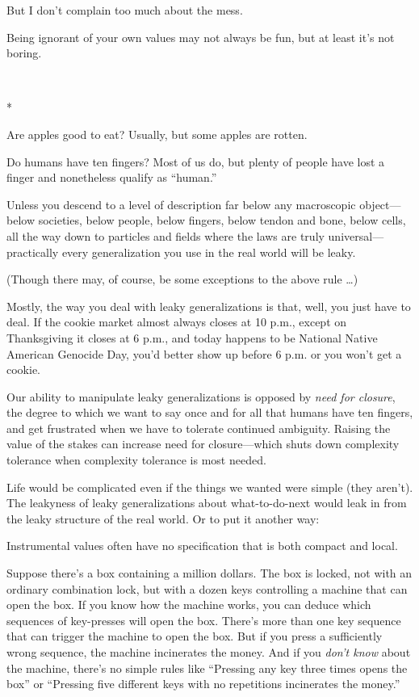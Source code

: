 {
 But I don't complain too much about the mess.}

{
 Being ignorant of your own values may not always be fun, but at
least it's not boring.}

{\centering
 \ ~
\par}

{\centering
 *
\par}


{
 Are apples good to eat? Usually, but some apples are rotten. }

{
 Do humans have ten fingers? Most of us do, but plenty of people
have lost a finger and nonetheless qualify as
``human.''}

{
 Unless you descend to a level of description far below any
macroscopic object---below societies, below people, below fingers,
below tendon and bone, below cells, all the way down to particles and
fields where the laws are truly universal---practically every
generalization you use in the real world will be leaky.}

{
 (Though there may, of course, be some exceptions to the above rule
\ldots)}

{
 Mostly, the way you deal with leaky generalizations is that, well,
you just have to deal. If the cookie market almost always closes at 10
p.m., except on Thanksgiving it closes at 6 p.m., and today happens to
be National Native American Genocide Day, you'd better
show up before 6 p.m. or you won't get a cookie.}

{
 Our ability to manipulate leaky generalizations is opposed by
\textit{need for closure}, the degree to which we want to say once and
for all that humans have ten fingers, and get frustrated when we have
to tolerate continued ambiguity. Raising the value of the stakes can
increase need for closure---which shuts down complexity tolerance when
complexity tolerance is most needed.}

{
 Life would be complicated even if the things we wanted were simple
(they aren't). The leakyness of leaky generalizations
about what-to-do-next would leak in from the leaky structure of the
real world. Or to put it another way:}

{
 Instrumental values often have no specification that is both
compact and local.}

{
 Suppose there's a box containing a million
dollars. The box is locked, not with an ordinary combination lock, but
with a dozen keys controlling a machine that can open the box. If you
know how the machine works, you can deduce which sequences of
key-presses will open the box. There's more than one
key sequence that can trigger the machine to open the box. But if you
press a sufficiently wrong sequence, the machine incinerates the money.
And if you \textit{don't know} about the machine,
there's no simple rules like
``Pressing any key three times opens the
box'' or ``Pressing five different
keys with no repetitions incinerates the money.''}

